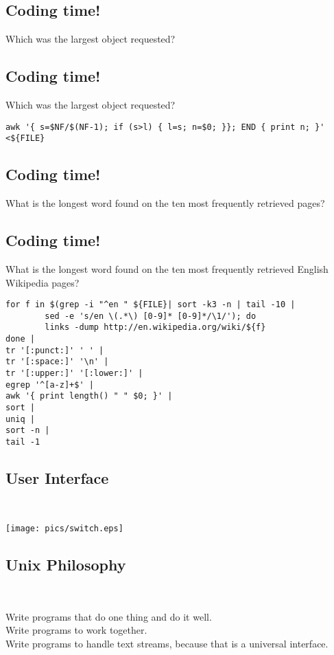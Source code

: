 \documentclass[xga]{xdvislides}
\begin{document}
\subsection{Coding time!}
Which was the largest object requested?

\subsection{Coding time!}
Which was the largest object requested?
\begin{verbatim}
awk '{ s=$NF/$(NF-1); if (s>l) { l=s; n=$0; }}; END { print n; }' <${FILE}
\end{verbatim}

\subsection{Coding time!}
What is the longest word found on the ten most frequently retrieved pages?

\subsection{Coding time!}
What is the longest word found on the ten most frequently retrieved
English Wikipedia pages?

\begin{verbatim}
for f in $(grep -i "^en " ${FILE}| sort -k3 -n | tail -10 |
        sed -e 's/en \(.*\) [0-9]* [0-9]*/\1/'); do
        links -dump http://en.wikipedia.org/wiki/${f}
done |
tr '[:punct:]' ' ' |
tr '[:space:]' '\n' |
tr '[:upper:]' '[:lower:]' |
egrep '^[a-z]+$' |
awk '{ print length() " " $0; }' |
sort |
uniq |
sort -n |
tail -1
\end{verbatim}

\subsection{User Interface}
\\
\vspace*{\fill}
\begin{center}
	\texttt{[image: pics/switch.eps]}
\end{center}
\vspace*{\fill}


\subsection{Unix Philosophy}
\\
\Huge
\begin{center}
	Write programs that do one thing and do it well.\\
	\vspace{.5in}
	Write programs to work together. \\
	\vspace{.5in}
	Write programs to handle text streams, because that is a universal interface.
\end{center}
\Normalsize
\end{document}
